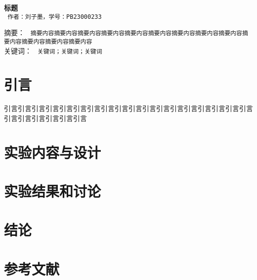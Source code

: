 \documentclass[a4paper]{extarticle}
\begin{document}
    \begin{center}
        \textbf{\fontsize{22pt}{\baselineskip} \selectfont 标题}\\
        \vspace{2em}
        \texttt{\fontsize{14pt}{\baselineskip} \selectfont 作者：刘子墨，学号：PB23000233}\\
    \end{center}
    \vspace{2em}
    \hspace{2em}\textsf{\fontsize{9pt}{\baselineskip} \selectfont 摘要：}
    \texttt{\fontsize{9pt}{\baselineskip} \selectfont 摘要内容摘要内容摘要内容摘要内容摘要内容摘要内容摘要内容摘要内容摘要内容摘要内容摘要内容摘要内容摘要内容}\\

    \hspace{2em}\textsf{\fontsize{9pt}{\baselineskip} \selectfont 关键词：}
    \texttt{\fontsize{9pt}{\baselineskip} \selectfont 关键词；关键词；关键词}\\
    
    \section{引言}
    \hspace{2em}引言引言引言引言引言引言引言引言引言引言引言引言引言引言引言引言引言引言引言引言引言引言引言引言
    \section{实验内容与设计}
    \cite{RN1}
    \section{实验结果和讨论}

    \section{结论}

    \section*{参考文献}
    \printbibliography[heading=none]
\end{document}
